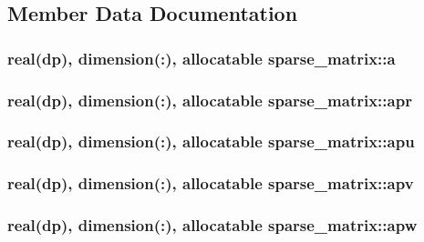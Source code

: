 \subsection{Member Data Documentation}
\hypertarget{classsparse__matrix_a2a9ab7da94dd5aa82b18a3d4748adb4e}{
\subsubsection[{a}]{\setlength{\rightskip}{0pt plus 5cm}real(dp), dimension(\-:), allocatable sparse\-\_\-matrix\-::a}}\label{classsparse__matrix_a2a9ab7da94dd5aa82b18a3d4748adb4e}
\hypertarget{classsparse__matrix_a9fd644b9786555d9955e8d943c1ac228}{
\subsubsection[{apr}]{\setlength{\rightskip}{0pt plus 5cm}real(dp), dimension(\-:), allocatable sparse\-\_\-matrix\-::apr}}\label{classsparse__matrix_a9fd644b9786555d9955e8d943c1ac228}
\hypertarget{classsparse__matrix_a699e66e8c57459cd313568e687ee1fc4}{
\subsubsection[{apu}]{\setlength{\rightskip}{0pt plus 5cm}real(dp), dimension(\-:), allocatable sparse\-\_\-matrix\-::apu}}\label{classsparse__matrix_a699e66e8c57459cd313568e687ee1fc4}
\hypertarget{classsparse__matrix_a07a78a7794c84e258becc676096f3201}{
\subsubsection[{apv}]{\setlength{\rightskip}{0pt plus 5cm}real(dp), dimension(\-:), allocatable sparse\-\_\-matrix\-::apv}}\label{classsparse__matrix_a07a78a7794c84e258becc676096f3201}
\hypertarget{classsparse__matrix_a57f3206d8ccad08131056ba13ae81af4}{
\subsubsection[{apw}]{\setlength{\rightskip}{0pt plus 5cm}real(dp), dimension(\-:), allocatable sparse\-\_\-matrix\-::apw}}\label{classsparse__matrix_a57f3206d8ccad08131056ba13ae81af4}
